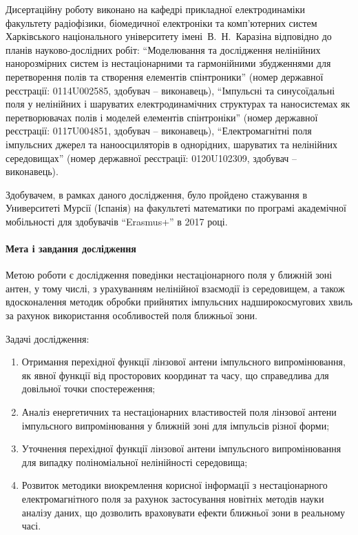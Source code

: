 Дисертаційну роботу виконано на кафедрі прикладної електродинаміки факультету 
радіофізики, біомедичної електроніки та комп’ютерних систем Харківського 
національного університету імені~В.~Н.~Каразіна відповідно до планів 
науково-дослідних робіт: ``Моделювання та дослідження 
нелінійних нанорозмірних систем із нестаціонарними та гармонійними 
збудженнями для перетворення полів та створення елементів спінтроники'' 
(номер державної реєстрації: 0114U002585, здобувач -- виконавець), 
``Імпульсні та синусоїдальні поля у нелінійних і шаруватих електродинамічних 
структурах та наносистемах як перетворювачах полів і моделей елементів 
спінтроніки'' (номер державної реєстрації: 0117U004851, здобувач -- виконавець),
``Електромагнітні поля імпульсних джерел та наноосциляторів в однорідних, 
шаруватих та нелінійних середовищах'' (номер державної реєстрації: 0120U102309, 
здобувач -- виконавець).

Здобувачем, в рамках даного дослідження, було пройдено стажування в 
Университеті Мурсії (Іспанія) на факультеті математики по програмі 
академічної мобільності для здобувачів ``Erasmus+'' в 2017 році.

\paragraph{Мета і завдання дослідження}

Метою роботи є дослідження поведінки нестаціонарного поля у ближній зоні антен, 
у тому числі, з урахуванням нелінійної взаємодії із середовищем, а також 
вдосконалення методик обробки прийнятих імпульсних надширокосмугових хвиль за 
рахунок використання особливостей поля ближньої зони.

Задачі дослідження:

\begin{enumerate}

\item Отримання перехідної функції лінзової антени імпульсного 
випромінювання, як явної функції від просторових координат та часу, що 
справедлива для довільної точки спостереження;

\item Аналіз енергетичних та нестаціонарних властивостей поля лінзової антени 
імпульсного випромінювання у ближній зоні для імпульсів різної форми;

\item Уточнення перехідної функції лінзової антени імпульсного 
випромінювання для випадку поліноміальної нелінійності середовища;

\item Розвиток методики виокремлення корисної інформації з нестаціонарного 
електромагнітного поля за рахунок застосування новітніх методів науки аналізу 
даних, що дозволить враховувати ефекти ближньої зони в реальному часі.

\end{enumerate}


